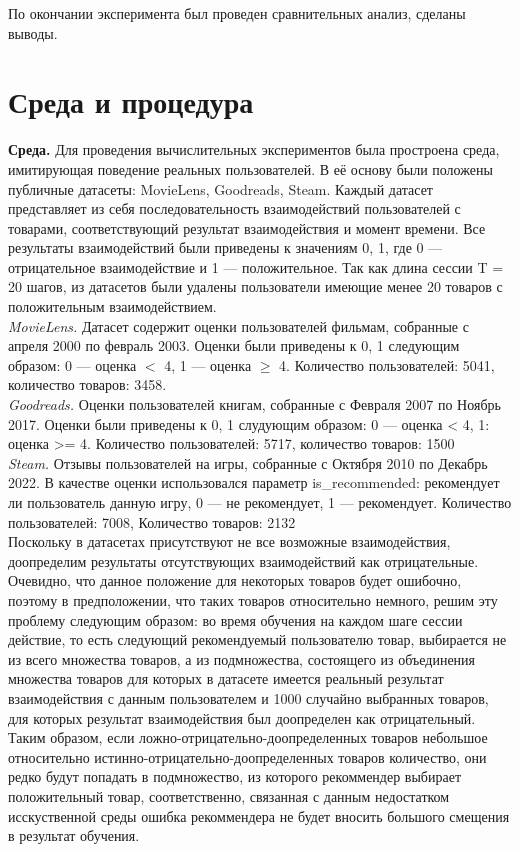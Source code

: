 \documentclass{mipt-thesis-ms}
\renewcommand{\geq}{\geqslant}  %
\begin{document}
По окончании эксперимента был проведен сравнительных анализ, сделаны выводы.

\section{Среда и процедура}
{\bf Среда.} Для проведения вычислительных экспериментов была простроена среда, имитирующая поведение реальных пользователей. В её основу были положены публичные датасеты: MovieLens, Goodreads, Steam. Каждый датасет представляет из себя последовательность взаимодействий пользователей с товарами, соответствующий результат взаимодействия и момент времени. Все результаты взаимодействий были приведены к значениям {0, 1}, где 0 --- отрицательное взаимодействие и 1 --- положительное. Так как длина сессии T = 20 шагов, из датасетов были удалены пользователи имеющие менее 20 товаров с положительным взаимодействием.\\

{\it MovieLens.} Датасет содержит оценки пользователей фильмам, собранные с апреля 2000 по февраль 2003. Оценки были приведены к {0, 1} следующим образом: 0 --- оценка $<$ 4, 1 --- оценка $\geq$ 4. Количество пользователей: 5041, количество товаров: 3458.\\

{\it Goodreads.} Оценки пользователей книгам, собранные с Февраля 2007 по
Ноябрь 2017. Оценки были приведены к {0, 1} слудующим образом: 0 --- оценка < 4, 1: оценка >= 4. Количество пользователей: 5717, количество товаров: 1500\\

{\it Steam.} Отзывы пользователей на игры, собранные с Октября 2010 по
Декабрь 2022. В качестве оценки использовался параметр is\_recommended: рекомендует ли пользователь данную игру, 0 --- не рекомендует, 1 --- рекомендует. Количество пользователей: 7008, Количество товаров: 2132\\

Поскольку в датасетах присутствуют не все возможные взаимодействия, доопределим результаты отсутствующих взаимодействий как отрицательные. Очевидно, что данное положение для некоторых товаров будет ошибочно, поэтому в предположении, что таких товаров относительно немного, решим эту проблему следующим образом: во время обучения на каждом шаге сессии действие, то есть следующий рекомендуемый пользователю товар, выбирается не из всего множества товаров, а из подмножества, состоящего из объединения множества товаров для которых в датасете имеется реальный результат взаимодействия с данным пользователем и 1000 случайно выбранных товаров, для которых результат взаимодействия был доопределен как отрицательный. Таким образом, если ложно-отрицательно-доопределенных товаров небольшое относительно истинно-отрицательно-доопределенных товаров количество, они редко будут попадать в подмножество, из которого рекоммендер выбирает положительный товар, соответственно, связанная с данным недостатком исскуственной среды ошибка рекоммендера не будет вносить большого смещения в результат обучения.\\
\end{document}
